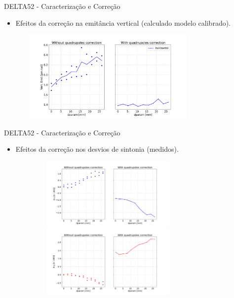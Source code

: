 \documentclass{beamer}					  %
\begin{document}
\begin{frame}{DELTA52 - Caracterização e Correção}
    \begin{itemize}
    		\item Efeitos da correção na emitância vertical (calculado modelo calibrado).
    \end{itemize}
    \begin{figure}[H]
        	\centering
            \includegraphics[height=4.5cm, width=9cm]{2024-01-26/figures/quad_ffwd_emit_effect.png}\\ 
    \end{figure} 
\end{frame}


\begin{frame}{DELTA52 - Caracterização e Correção}
    \begin{itemize}
    		\item Efeitos da correção nos desvios de sintonia (medidos).
    \end{itemize}
    \begin{figure}[H]
        	\centering
            \includegraphics[height=3.5cm, width=9cm]{2024-01-26/figures/loco_tunex_corr.png}\\ 
            \includegraphics[height=3.5cm, width=9cm]{2024-01-26/figures/loco_tuney_corr.png}\\ 
    \end{figure} 
\end{frame}
\end{document}
